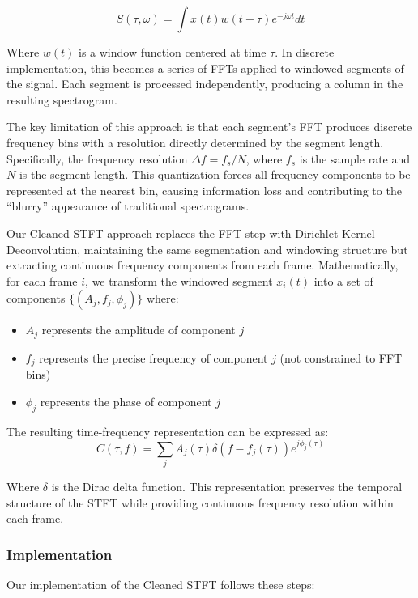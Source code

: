 \documentclass[11pt,twoside]{report}
\numberwithin{thm}{section}
\numberwithin{equation}{section}
\begin{document}
\begin{equation}
S(\tau, \omega) = \int x(t)w(t - \tau)e^{-j\omega t} dt
\end{equation}

Where $w(t)$ is a window function centered at time $\tau$. In discrete implementation, this becomes a series of FFTs applied to windowed segments of the signal. Each segment is processed independently, producing a column in the resulting spectrogram.

The key limitation of this approach is that each segment's FFT produces discrete frequency bins with a resolution directly determined by the segment length. Specifically, the frequency resolution $\Delta f = f_s/N$, where $f_s$ is the sample rate and $N$ is the segment length. This quantization forces all frequency components to be represented at the nearest bin, causing information loss and contributing to the ``blurry'' appearance of traditional spectrograms.

Our Cleaned STFT approach replaces the FFT step with Dirichlet Kernel Deconvolution, maintaining the same segmentation and windowing structure but extracting continuous frequency components from each frame. Mathematically, for each frame $i$, we transform the windowed segment $x_i(t)$ into a set of components $\{(A_j, f_j, \phi_j)\}$ where:

\begin{itemize}
    \item $A_j$ represents the amplitude of component $j$
    \item $f_j$ represents the precise frequency of component $j$ (not constrained to FFT bins)
    \item $\phi_j$ represents the phase of component $j$
\end{itemize}

The resulting time-frequency representation can be expressed as:
\begin{equation}
C(\tau, f) = \sum_j A_j(\tau)\delta(f - f_j(\tau))e^{j\phi_j(\tau)}
\end{equation}

Where $\delta$ is the Dirac delta function. This representation preserves the temporal structure of the STFT while providing continuous frequency resolution within each frame.

\subsubsection{Implementation}
Our implementation of the Cleaned STFT follows these steps:
\end{document}
